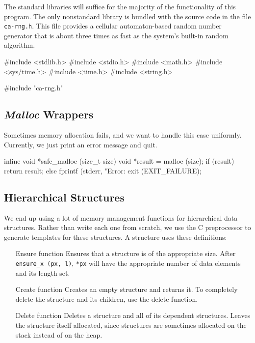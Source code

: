 \documentclass{article}
\begin{document}
      The standard libraries will suffice for the majority of the functionality
      of this program. The only nonstandard library is bundled with the source
      code in the file \verb|ca-rng.h|. This file provides a cellular
      automaton-based random number generator that is about three times as fast
      as the system's built-in random algorithm.

\begin{ccode}
#include <stdlib.h>
#include <stdio.h>
#include <math.h>
#include <sys/time.h>
#include <time.h>
#include <string.h>

#include "ca-rng.h"
\end{ccode}

    \subsection{{\em Malloc} Wrappers}
      \label{sec:malloc}

      Sometimes memory allocation fails, and we want to handle this case
      uniformly. Currently, we just print an error message and quit.

\begin{ccode}
inline void *safe_malloc (size_t size) {
  void *result = malloc (size);
  if (result)
    return result;
  else {
    fprintf (stderr, "Error: %
    exit (EXIT_FAILURE);
  }
}
\end{ccode}

    \subsection{Hierarchical Structures}
      \label{sec:hierarchical}

      We end up using a lot of memory management functions for hierarchical data
      structures. Rather than write each one from scratch, we use the C
      preprocessor to generate templates for these structures. A structure uses
      these definitions:

      \begin{enumerate}
        \item[Ensure function]
        Ensures that a structure is of the appropriate size. After
        \verb|ensure_x (px, l)|, \verb|*px| will have the appropriate number of
        data elements and its length set.

        \item[Create function]
        Creates an empty structure and returns it. To completely delete the
        structure and its children, use the delete function.

        \item[Delete function]
        Deletes a structure and all of its dependent structures. Leaves the
        structure itself allocated, since structures are sometimes allocated on
        the stack instead of on the heap.
      \end{enumerate}
\end{document}
